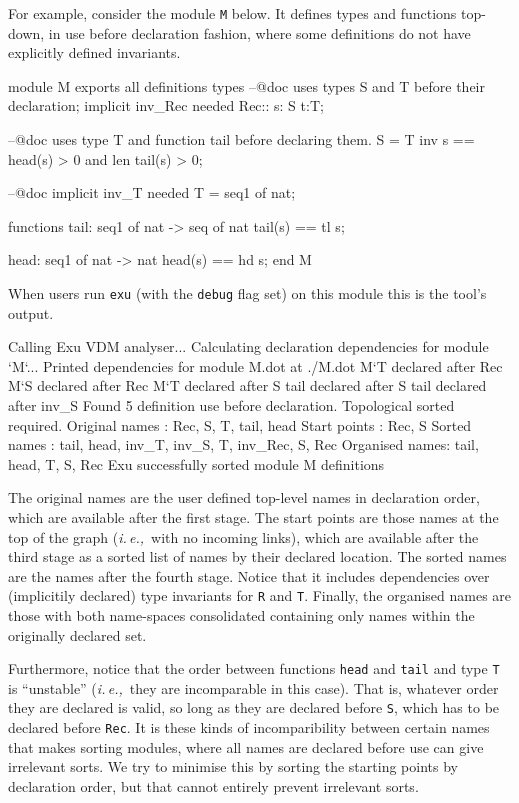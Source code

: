 \documentclass[runningheads,a4paper]{llncs}
\newcommand{\ie}{{\em i.\,e.,\/}}
\begin{document}
For example, consider the module \verb'M' below. It defines types and functions top-down, in use before declaration fashion, where some definitions do not have explicitly defined invariants. 
%
\begin{vdmsl}[frame=none,basicstyle=\ttfamily\scriptsize,numbers=left,stepnumber=1]
    module M 
    exports all
    definitions 
    types 
        --@doc uses types S and T before their declaration; implicit inv_Rec needed
        Rec:: s: S t:T;
        
        --@doc uses type T and function tail before declaring them.
        S = T inv s == head(s) > 0 and len tail(s) > 0;
        
        --@doc implicit inv_T needed
        T = seq1 of nat;

    functions
        tail: seq1 of nat -> seq of nat
        tail(s) == tl s;

        head: seq1 of nat -> nat
        head(s) == hd s;
    end M
\end{vdmsl}
%
When users run \verb'exu' (with the \verb'debug' flag set) on this module this is the tool's output. 
%
\begin{vdmsl}[frame=none,basicstyle=\ttfamily\scriptsize]
    Calling Exu VDM analyser...
    Calculating declaration dependencies for module `M`...
    Printed dependencies for module M.dot at ./M.dot
    M`T declared after Rec
    M`S declared after Rec
    M`T declared after S
    tail declared after S
    tail declared after inv_S
    Found 5 definition use before declaration. Topological sorted required.
    Original names : Rec, S, T, tail, head
    Start points   : Rec, S
    Sorted names   : tail, head, inv_T, inv_S, T, inv_Rec, S, Rec
    Organised names: tail, head, T, S, Rec
    Exu successfully sorted module M definitions
\end{vdmsl}
%
The original names are the user defined top-level names in declaration order, which are available after the first stage. The start points are those names at the top of the graph (\ie~with no incoming links), which are available after the third stage as a sorted list of names by their declared location. The sorted names are the names after the fourth stage. Notice that it includes dependencies over (implicitily declared) type invariants for \verb'R' and \verb'T'. Finally, the organised names are those with both name-spaces consolidated containing only names within the originally declared set. 

Furthermore, notice that the order between functions \verb'head' and \verb'tail' and type \verb'T' is ``unstable'' (\ie~they are incomparable in this case). That is, whatever order they are declared is valid, so long as they are declared before \verb'S', which has to be declared before \verb'Rec'. It is these kinds of incomparibility between certain names that makes sorting modules, where all names are declared before use can give irrelevant sorts. We try to minimise this by sorting the starting points by declaration order, but that cannot entirely prevent irrelevant sorts.  
\end{document}
